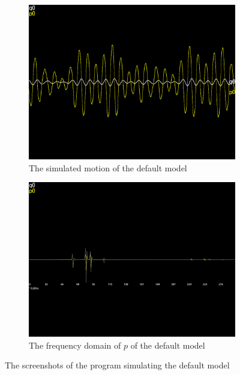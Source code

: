 \documentclass[12pt]{article}
\begin{document}
\begin{figure}[h]
  \centering
  \begin{subfigure}[b]{0.45\linewidth}
    \includegraphics[width=\linewidth]{default_motion.png}
    \caption{The simulated motion of the default model}
  \end{subfigure}
  \begin{subfigure}[b]{0.45\linewidth}
    \includegraphics[width=\linewidth]{default_p0_frequencies.png}
    \caption{The frequency domain of $p$ of the default model}
  \end{subfigure}
  \caption{The screenshots of the program simulating the default model}
  \label{fig:default}
\end{figure}
\end{document}
